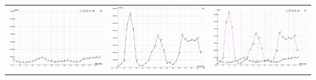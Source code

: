 \documentclass{report}
\begin{document}
\begin{table}[H]
    \centering
    \begin{tabular}{|l|l|l|} 
    \hline
    \includegraphics[scale=0.133]{Bileter/Torsk.png} &  \includegraphics[scale=0.133]{Bileter/Lodde.png} & \includegraphics[scale=0.133]{Bileter/BeggeFiskene.png}  \\ 

\end{tabular}
\end{table}
\end{document}
